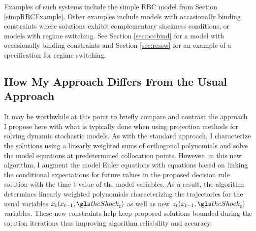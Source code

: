 \documentclass[12pt]{article}
\begin{document}
 Examples of such systems include the simple RBC model from Section
\ref{simpRBCExample}.
Other examples include  models with 
occasionally binding constraints where solutions 
exhibit complementary slackness conditions, or models with 
regime switching.   See Section \ref{sec:occbind} for a model with
occasionally binding constraints and
Section \ref{sec:ressw} for an example 
of a specification for regime switching.






\subsection{How My Approach Differs From the Usual Approach}
\label{sec:walkthrough}


It may be worthwhile at this point
to briefly compare and contrast the approach I propose here with 
what is typically done when using projection methods 
for solving dynamic stochastic models.
As with the standard approach, I characterize the solutions using a linearly
weighted sums of orthogonal polynomials and solve the model equations
at predetermined collocation points. However, in this new algorithm, I 
augment the model Euler equations with equations based on 
  linking the conditional expectations for future values in
the proposed decision rule solution with the
time t value of the model variables.  As a result, the algorithm determines
linearly weighted polynomials characterizing the 
trajectories for the usual
variables $x_t(x_{t-1},\theShock_t)$ as well as new  $z_t(x_{t-1},\theShock_t)$ variables.  These new constraints 
help keep proposed solutions bounded during the solution iterations 
thus improving algorithm reliability and accuracy.




\end{document}
